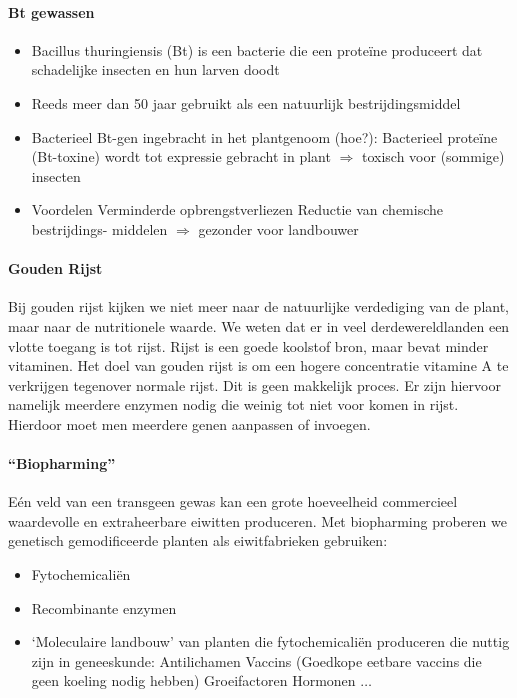 \documentclass[a4paper,kul]{kulakarticle} %
\begin{document}
\paragraph{Bt gewassen}
\begin{itemize}
	\item Bacillus thuringiensis (Bt) is een bacterie die een
	proteïne produceert dat schadelijke insecten en
	hun larven doodt
	\item Reeds meer dan 50 jaar gebruikt als een
	natuurlijk bestrijdingsmiddel
	\item Bacterieel Bt-gen ingebracht in het plantgenoom
	(hoe?): Bacterieel proteïne (Bt-toxine)
	wordt tot expressie gebracht in plant
	$\Rightarrow$ toxisch voor (sommige) insecten
	\item Voordelen
	\subitem Verminderde opbrengstverliezen
	\subitem Reductie van chemische bestrijdings-
	middelen $\Rightarrow$ gezonder voor landbouwer
\end{itemize}
\paragraph{Gouden Rijst}
Bij gouden rijst kijken we niet meer naar de natuurlijke verdediging van de plant, maar naar de nutritionele waarde. We weten dat er in veel derdewereldlanden een vlotte toegang is tot rijst. Rijst is een goede koolstof bron, maar bevat minder vitaminen. Het doel van gouden rijst is om een hogere concentratie vitamine A te verkrijgen tegenover normale rijst. Dit is geen makkelijk proces. Er zijn hiervoor namelijk meerdere enzymen nodig die weinig tot niet voor komen in rijst. Hierdoor moet men meerdere genen aanpassen of invoegen. 
\paragraph{“Biopharming”}
Eén veld van een transgeen gewas kan een grote hoeveelheid commercieel waardevolle en extraheerbare eiwitten produceren. Met biopharming proberen we genetisch gemodificeerde planten als eiwitfabrieken gebruiken: 
\begin{itemize}
	\item Fytochemicaliën
	\item Recombinante enzymen
	\item `Moleculaire landbouw' van planten die fytochemicaliën produceren die
	nuttig zijn in geneeskunde:
	\subitem Antilichamen
	\subitem Vaccins (Goedkope eetbare vaccins die
	geen koeling nodig hebben)
	\subitem Groeifactoren
	\subitem Hormonen
	\subitem $\ldots$
\end{itemize}
\end{document}
